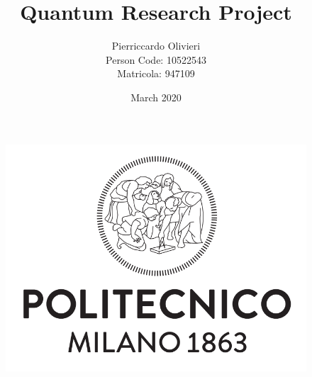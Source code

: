 \documentclass[]{article}
\title{\textbf{Quantum Research Project}}
\author{Pierriccardo Olivieri \\
        Person Code: 10522543 \\
        Matricola: 947109
}
\date{March 2020}
\begin{document}
\maketitle

\begin{figure}[h!]
    \centering
    \includegraphics[scale=0.45]{img/logo.png}
\end{figure}

\newpage
{}
\tableofcontents




    
\end{document}
